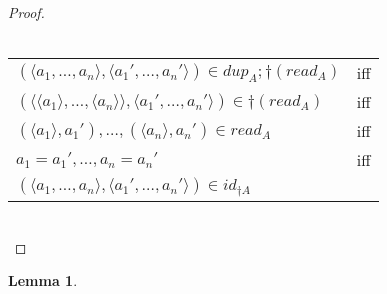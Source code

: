 \documentclass{article}
\newtheorem{lemma}{Lemma}
\begin{document}
\begin{proof}~\\~\\
\begin{tabular}{ll}
$(\langle a_1, \ldots, a_n \rangle, \langle a_1', \ldots, a_n' \rangle) \in \mathit{dup}_A;\dagger(\mathit{read}_A)$ & iff \\
$(\langle \langle a_1 \rangle, \ldots, \langle a_n \rangle \rangle, \langle a_1', \ldots, a_n' \rangle) \in \dagger(\mathit{read}_A)$ & iff \\
$(\langle a_1 \rangle, a_1'),\ldots,(\langle a_n \rangle, a_n') \in \mathit{read_A}$ & iff \\
$a_1 = a_1', \ldots, a_n = a_n'$ & iff \\
$(\langle a_1, \ldots, a_n \rangle, \langle a_1', \ldots, a_n' \rangle) \in \mathit{id}_{\dagger A}$
\end{tabular}~\\
\end{proof}

\begin{lemma}

\end{lemma}
\end{document}
